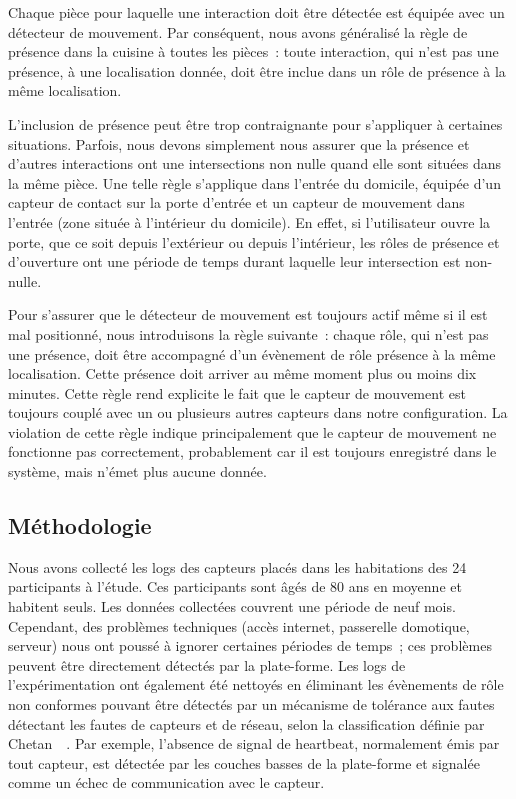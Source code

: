 Chaque pièce pour laquelle une interaction doit être détectée est équipée avec 
un détecteur de mouvement. Par conséquent, nous avons généralisé la règle de 
présence dans la cuisine à toutes les pièces~: toute interaction, qui n'est pas 
une présence, à une localisation donnée, doit être inclue dans un rôle de 
présence à la même localisation. 

L'inclusion de présence peut être trop contraignante pour s'appliquer à 
certaines situations. Parfois, nous devons simplement nous assurer que la 
présence et d'autres interactions ont une intersections non nulle quand elle 
sont situées dans la même pièce. Une telle règle s'applique dans l'entrée du 
domicile, équipée d'un capteur de contact sur la porte d'entrée et un capteur 
de mouvement dans l'entrée (zone située à l'intérieur du domicile). 
En effet, si l'utilisateur ouvre la porte, que ce soit 
depuis l'extérieur ou depuis l'intérieur, les rôles de présence et d'ouverture ont une 
période de temps durant laquelle leur intersection est non-nulle.

Pour s'assurer que le détecteur de mouvement est toujours actif même si il est 
mal positionné, nous introduisons la règle suivante~: chaque rôle, qui n'est pas 
une présence, doit être accompagné d'un évènement de rôle présence à la même 
localisation. Cette présence doit arriver au même moment plus ou moins dix minutes. 
Cette règle rend explicite le fait que le capteur de mouvement est toujours 
couplé avec un ou plusieurs autres capteurs dans notre configuration. La 
violation de cette règle indique principalement que le capteur de mouvement 
ne fonctionne pas correctement, probablement car il est toujours enregistré dans le système, 
mais n'émet plus aucune donnée.

\subsection{Méthodologie}\label{validation:methodology}
Nous avons collecté les logs des capteurs placés dans les habitations des 24 participants à 
l'étude. Ces participants sont âgés de 80 ans en moyenne et habitent seuls. Les 
données collectées couvrent une période de neuf mois. Cependant, des problèmes 
techniques (\eg accès internet, passerelle domotique, serveur) nous ont poussé 
à ignorer certaines périodes de temps~; ces problèmes peuvent être directement 
détectés par la plate-forme. Les logs de l'expérimentation ont également 
été nettoyés en éliminant les évènements de rôle non conformes 
pouvant être détectés par un mécanisme de tolérance aux fautes détectant 
les fautes de capteurs et de réseau, selon la classification définie 
par Chetan~\etal~\parencite{chetan2005toward}.
Par exemple, l'absence de signal de heartbeat, normalement émis par tout capteur, 
est détectée par les couches basses de la plate-forme et signalée comme un échec 
de communication avec le capteur.

